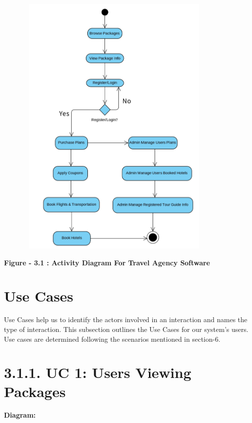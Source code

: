\documentclass{scrreprt}
\begin{document}
{\includegraphics[width=450px, height=500px]{actd.jpg}}

\begin{center}
    \parbox{0.8\textwidth}{ 
        \centering
        \textbf{Figure - 3.1 : Activity Diagram For Travel Agency Software}
    }
\end{center}
\section{Use Cases}
Use Cases help us to identify the actors involved in an interaction and names the type of interaction.
This subsection outlines the Use Cases for our system’s users. Use cases are determined following
the scenarios mentioned in section-6.

\section*{\textbf{3.1.1. UC 1: Users Viewing Packages}}
\textbf{Diagram:}
\newline
\newline
\begin{center}
    \parbox{0.8\textwidth}{ 
        \centering
    }
\end{center}
\end{document}
